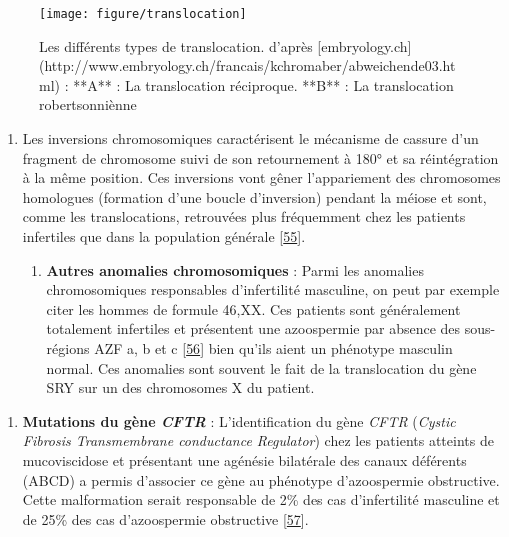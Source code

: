 \documentclass[12pt,twoside]{reedthesis}
\providecommand{\tightlist}{%
  \setlength{\itemsep}{0pt}\setlength{\parskip}{0pt}}
\theoremstyle{definition}
\theoremstyle{definition}
\theoremstyle{remark}
\begin{document}
  \begin{figure}
  
  {\centering \texttt{[image: figure/translocation]} 
  
  }
  
  \caption[Les différents types de translocation.]{Les différents types de translocation. d'après [embryology.ch](http://www.embryology.ch/francais/kchromaber/abweichende03.html) :  **A** : La translocation réciproque. **B** : La translocation robertsonniènne}\label{fig:figtranslocation}
  \end{figure}
  
  \begin{enumerate}
  \def\labelenumi{\roman{enumi}.}
  \setcounter{enumi}{1}
  \item
    Les inversions chromosomiques caractérisent le mécanisme de cassure
    d'un fragment de chromosome suivi de son retournement à 180° et sa
    réintégration à la même position. Ces inversions vont gêner
    l'appariement des chromosomes homologues (formation d'une boucle
    d'inversion) pendant la méiose et sont, comme les translocations,
    retrouvées plus fréquemment chez les patients infertiles que dans la
    population générale {[}\protect\hyperlink{ref-Krausz2000}{55}{]}.
  
    \begin{enumerate}
    \def\labelenumii{\alph{enumii}.}
    \setcounter{enumii}{2}
    \tightlist
    \item
      \textbf{Autres anomalies chromosomiques} : Parmi les anomalies
      chromosomiques responsables d'infertilité masculine, on peut par
      exemple citer les hommes de formule 46,XX. Ces patients sont
      généralement totalement infertiles et présentent une azoospermie par
      absence des sous- régions AZF a, b et c
      {[}\protect\hyperlink{ref-Vorona2007}{56}{]} bien qu'ils aient un
      phénotype masculin normal. Ces anomalies sont souvent le fait de la
      translocation du gène SRY sur un des chromosomes X du patient.
    \end{enumerate}
  \end{enumerate}
  
  \begin{enumerate}
  \def\labelenumi{\arabic{enumi}.}
  \setcounter{enumi}{2}
  \tightlist
  \item
    \textbf{Mutations du gène \emph{CFTR} }: L'identification du gène
    \emph{CFTR} (\emph{Cystic Fibrosis Transmembrane conductance
    Regulator}) chez les patients atteints de mucoviscidose et présentant
    une agénésie bilatérale des canaux déférents (ABCD) a permis
    d'associer ce gène au phénotype d'azoospermie obstructive. Cette
    malformation serait responsable de 2\% des cas d'infertilité masculine
    et de 25\% des cas d'azoospermie obstructive
    {[}\protect\hyperlink{ref-Yu2012}{57}{]}.
  \end{enumerate}
  
\end{document}
